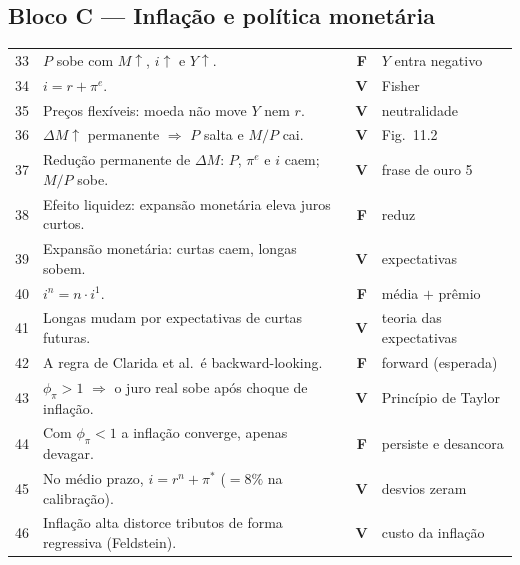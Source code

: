 \documentclass[12pt, a4paper]{article}
\newcommand{\Vok}{\textbf{\textcolor{greenbox}{V}}}
\newcommand{\Fno}{\textbf{\textcolor{redf}{F}}}
\begin{document}
\subsection*{Bloco C --- Inflação e política monetária}
{\footnotesize
\renewcommand{\arraystretch}{1.3}
\begin{tabular}{p{0.5cm} p{9.2cm} c p{3.6cm}}
\toprule
33 & $P$ sobe com $M\uparrow$, $i\uparrow$ e $Y\uparrow$. &
\Fno & $Y$ entra negativo \\
34 & $i = r + \pi^e$. & \Vok & Fisher \\
35 & Preços flexíveis: moeda não move $Y$ nem $r$. &
\Vok & neutralidade \\
36 & $\Delta M\uparrow$ permanente $\Rightarrow$ $P$ salta e $M/P$ cai. &
\Vok & Fig.\ 11.2 \\
37 & Redução permanente de $\Delta M$: $P$, $\pi^e$ e $i$ caem; $M/P$ sobe. &
\Vok & frase de ouro 5 \\
38 & Efeito liquidez: expansão monetária eleva juros curtos. &
\Fno & reduz \\
39 & Expansão monetária: curtas caem, longas sobem. &
\Vok & expectativas \\
40 & $i^n = n \cdot i^1$. & \Fno & média $+$ prêmio \\
41 & Longas mudam por expectativas de curtas futuras. &
\Vok & teoria das expectativas \\
42 & A regra de Clarida et al.\ é backward-looking. &
\Fno & forward (esperada) \\
43 & $\phi_\pi > 1$ $\Rightarrow$ o juro real sobe após choque de inflação. &
\Vok & Princípio de Taylor \\
44 & Com $\phi_\pi < 1$ a inflação converge, apenas devagar. &
\Fno & persiste e desancora \\
45 & No médio prazo, $i = r^n + \pi^*$ ($= 8\%$ na calibração). &
\Vok & desvios zeram \\
46 & Inflação alta distorce tributos de forma regressiva (Feldstein). &
\Vok & custo da inflação \\
\bottomrule
\end{tabular}
}
\end{document}
